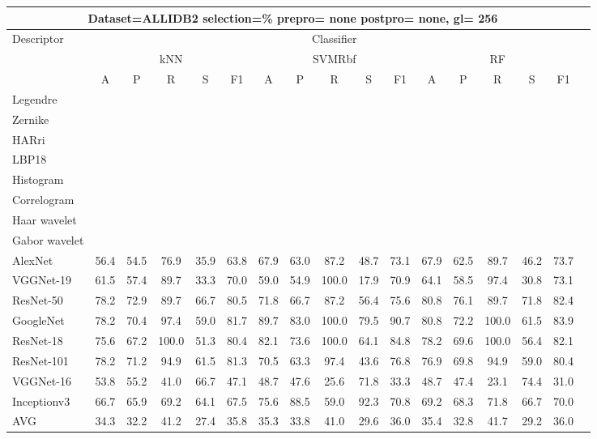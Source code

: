 \documentclass[12pt,italian]{article}
\begin{document}
\begin{tiny}
 \pagebreak 
\begin{longtable}{lcccccccccccccccc}
\toprule
\multicolumn{16}{c}{Dataset=ALLIDB2 selection=\% prepro= none postpro= none, gl= 256} \\ 
\toprule
Descriptor & \multicolumn{15}{c}{Classifier} \\ 
& \multicolumn{5}{c}{kNN} & \multicolumn{5}{c}{SVMRbf} & \multicolumn{5}{c}{RF} \\ 
& A & P & R & S & F1 & A & P & R & S & F1 & A & P & R & S & F1 \\ 
\midrule
Legendre \\ 
Zernike \\ 
HARri \\ 
LBP18 \\ 
Histogram \\ 
Correlogram \\ 
Haar wavelet \\ 
Gabor wavelet \\ 
AlexNet & 56.4 & 54.5 & 76.9 & 35.9 & 63.8 & 67.9 & 63.0 & 87.2 & 48.7 & 73.1 & 67.9 & 62.5 & 89.7 & 46.2 & 73.7 \\ 
VGGNet-19 & 61.5 & 57.4 & 89.7 & 33.3 & 70.0 & 59.0 & 54.9 & 100.0 & 17.9 & 70.9 & 64.1 & 58.5 & 97.4 & 30.8 & 73.1 \\ 
ResNet-50 & 78.2 & 72.9 & 89.7 & 66.7 & 80.5 & 71.8 & 66.7 & 87.2 & 56.4 & 75.6 & 80.8 & 76.1 & 89.7 & 71.8 & 82.4 \\ 
GoogleNet & 78.2 & 70.4 & 97.4 & 59.0 & 81.7 & 89.7 & 83.0 & 100.0 & 79.5 & 90.7 & 80.8 & 72.2 & 100.0 & 61.5 & 83.9 \\ 
ResNet-18 & 75.6 & 67.2 & 100.0 & 51.3 & 80.4 & 82.1 & 73.6 & 100.0 & 64.1 & 84.8 & 78.2 & 69.6 & 100.0 & 56.4 & 82.1 \\ 
ResNet-101 & 78.2 & 71.2 & 94.9 & 61.5 & 81.3 & 70.5 & 63.3 & 97.4 & 43.6 & 76.8 & 76.9 & 69.8 & 94.9 & 59.0 & 80.4 \\ 
VGGNet-16 & 53.8 & 55.2 & 41.0 & 66.7 & 47.1 & 48.7 & 47.6 & 25.6 & 71.8 & 33.3 & 48.7 & 47.4 & 23.1 & 74.4 & 31.0 \\ 
Inceptionv3 & 66.7 & 65.9 & 69.2 & 64.1 & 67.5 & 75.6 & 88.5 & 59.0 & 92.3 & 70.8 & 69.2 & 68.3 & 71.8 & 66.7 & 70.0 \\ 
\hline
AVG & 34.3 & 32.2 & 41.2 & 27.4 & 35.8 & 35.3 & 33.8 & 41.0 & 29.6 & 36.0 & 35.4 & 32.8 & 41.7 & 29.2 & 36.0 \\ 
\hline
\bottomrule
\end{longtable} 

 \pagebreak 
\end{tiny} 
 
\end{document}
